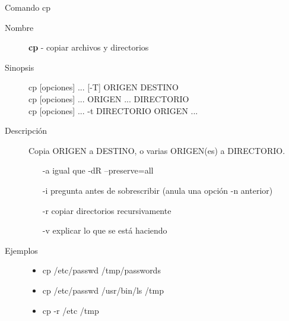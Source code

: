 \begin{frame}[c]{Comando cp}
  \begin{description}
    \item[Nombre]
      \textbf{cp} - copiar archivos y directorios

    \vspace{\baselineskip}
    \item[Sinopsis]
      cp [opciones] ... [-T] ORIGEN DESTINO \\
      cp [opciones] ... ORIGEN ... DIRECTORIO \\
      cp [opciones] ... -t DIRECTORIO  ORIGEN ...

    \vspace{\baselineskip}
    \item[Descripción]
      Copia ORIGEN a DESTINO, o varias ORIGEN(es) a DIRECTORIO.

      \begin{itemize}
        \item [-a] igual que -dR --preserve=all
        \item [-i] pregunta antes de sobrescribir (anula una opción -n
          anterior)
        \item [-r] copiar directorios recursivamente
        \item [-v] explicar lo que se está haciendo
      \end{itemize}

    \vspace{\baselineskip}
    \item[Ejemplos]
      \begin{itemize}
        \item cp /etc/passwd /tmp/passwords
        \item cp /etc/passwd /usr/bin/ls /tmp
        \item cp -r /etc /tmp
      \end{itemize}
  \end{description}
\end{frame}

